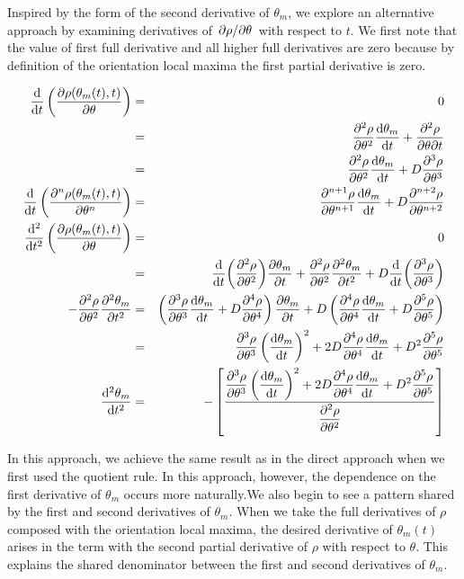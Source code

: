 \documentclass[11pt]{article} %
\begin{document}
Inspired by the form of the second derivative of $ \theta_m $, we explore an alternative approach by examining derivatives of $ \pdv*{\rho}{\theta} (\theta_m(t),t) $ with respect to $ t $. We first note that the value of first full derivative and all higher full derivatives are zero because by definition of the orientation local maxima the first partial derivative is zero.

\begin{eqnarray}
\dv{t} \left( \pdv{\rho(\theta_m(t),t)}{\theta} \right) & = & 0 \\
& = & \pdv[2]{\rho}{\theta} \dv{\theta_m}{t} + \pdv{\rho}{\theta}{t} \\
& = & \pdv[2]{\rho}{\theta} \dv{\theta_m}{t} + D \pdv[3]{\rho}{\theta} \\
\dv{t} \left( \pdv[n]{\rho(\theta_m(t),t)}{\theta} \right) & = & \pdv[n+1]{\rho}{\theta} \dv{\theta_m}{t} + D \pdv[n+2]{\rho}{\theta} \\
\dv[2]{t} \left( \pdv{\rho(\theta_m(t),t)}{\theta} \right) & = & 0 \\
& = & \dv{t}( \pdv[2]{\rho}{\theta} ) \pdv{\theta_m}{t} + \pdv[2]{\rho}{\theta} \pdv[2]{\theta_m}{t} + D \dv{t}( \pdv[3]{\rho}{\theta} ) \\
-  \pdv[2]{\rho}{\theta} \pdv[2]{\theta_m}{t}  & = &
 \left( \pdv[3]{\rho}{\theta} \dv{\theta_m}{t} + D \pdv[4]{\rho}{\theta} \right) \pdv{\theta_m}{t}
+ D\left( \pdv[4]{\rho}{\theta} \dv{\theta_m}{t} + D \pdv[5]{\rho}{\theta} \right) \\ 
 & = &  \pdv[3]{\rho}{\theta} \left( \dv{\theta_m}{t} \right)^2 + 2 D \pdv[4]{\rho}{\theta}  \dv{\theta_m}{t}  + D^2 \pdv[5]{\rho}{\theta}  \\
\dv[2]{\theta_m}{t} & = & - \left[ \frac{\displaystyle
\pdv[3]{\rho}{\theta} \left( \dv{\theta_m}{t} \right)^2
+ 2D \pdv[4]{\rho}{\theta} \dv{\theta_m}{t}
+ D^2 \pdv[5]{\rho}{\theta}
}{ \displaystyle \pdv[2]{\rho}{\theta} } \right]
\end{eqnarray}

In this approach, we achieve the same result as in the direct approach when we first used the quotient rule. In this approach, however, the dependence on the first derivative of $ \theta_m $ occurs more naturally.We also begin to see a pattern shared by the first and second derivatives of $ \theta_m $. When we take the full derivatives of $ \rho $ composed with the orientation local maxima, the desired derivative of $ \theta_m(t) $  arises in the term with the second partial derivative of $ \rho $ with respect to $ \theta $. This explains the shared denominator between the first and second derivatives of $ \theta_m $.
\end{document}
